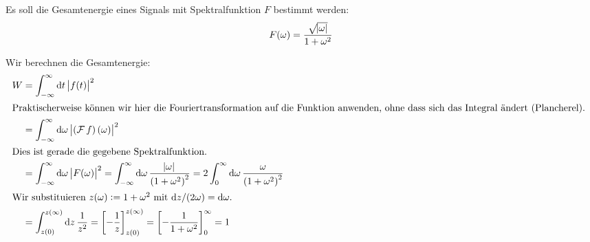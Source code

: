 Es soll die Gesamtenergie eines Signals mit Spektralfunktion $F$ bestimmt
werden:
\[
	F(\omega) = \frac{\sqrt{\abs \omega}}{1+\omega^2}
\]

Wir berechnen die Gesamtenergie:
\begin{align*}
	W
	&= \int_{-\infty}^{\infty} \dif t \, \abs{f(t)}^2 \\
	\intertext{%
		Praktischerweise können wir hier die Fouriertransformation auf die
		Funktion anwenden, ohne dass sich das Integral ändert (Plancherel).
	}
	&= \int_{-\infty}^{\infty} \dif \omega \, \abs{\del{\fourier f}(\omega)}^2 \\
	\intertext{%
		Dies ist gerade die gegebene Spektralfunktion.
	}
	&= \int_{-\infty}^{\infty} \dif \omega \, \abs{F(\omega)}^2
	= \int_{-\infty}^{\infty} \dif \omega \, \frac{\abs \omega}{\del{1+\omega^2}^2}
	= 2 \int_0^{\infty} \dif \omega \, \frac{\omega}{\del{1+\omega^2}^2} \\
	\intertext{%
		Wir substituieren $z(\omega) := 1 + \omega^2$ mit $\dif z / (2 \omega) = \dif \omega$.
	}
	&= \int_{z(0)}^{z(\infty)} \dif z \, \frac{1}{z^2}
	= \sbr{- \frac{1}{z}}_{z(0)}^{z(\infty)}
	= \sbr{- \frac{1}{1 + \omega^2}}_{0}^{\infty}
	= 1
\end{align*}

%
%



